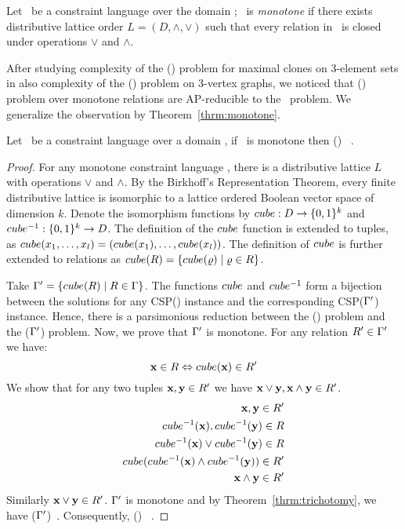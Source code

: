 \begin{defi} 
Let \mrelset\ be a constraint language over the domain \mD; \mrelset\ is \emph{monotone}
if there exists distributive lattice order \(L=(D,\wedge,\vee)\) such that every relation 
in \mrelset\ is closed under operations \(\vee\) and \(\wedge\)\@.
\end{defi}

After studying complexity of the \ccsp(\mrelset) problem for maximal clones on 3-element sets
in \cite{mvl} also complexity of the \chom(\mH) problem on 3-vertex graphs,
we noticed that \ccsp(\mrelset) problem over 
monotone relations are AP-reducible to the \cdsp\ problem. We generalize the observation by
Theorem~\ref{thrm:monotone}\@.

\begin{theorem} \label{thrm:monotone}
Let \mrelset\ be a constraint language over a domain \mD, if 
\mrelset\ is monotone then \ccsp(\mrelset) \maple\ \cbis\@.
\end{theorem}

\begin{proof}
For any monotone constraint language \mrelset, there is a distributive lattice \(L\) with operations
\(\vee\) and \(\wedge\)\@. By the Birkhoff's Representation Theorem, every finite distributive lattice
is isomorphic to a lattice ordered Boolean vector space of dimension \(k\)\@.
Denote the isomorphism functions by \(cube: D \to \{{0,1}\}^k\) and 
\(cube^{-1} : \{{0,1}\}^k\to D\)\@. The definition of the \(cube\) function
is extended to tuples, as \(cube(x_1,\dotsc,x_l)=(cube(x_1),\dotsc,cube(x_l))\)\@.
The definition of \(cube\) is further extended to relations as 
\(cube(R) = \{{cube(\varrho) \mid \varrho \in R}\}\)\@.

Take \(\Gamma'=\{{cube(R)\mid R\in \Gamma}\}\)\@. The functions \(cube\) and
\(cube^{-1}\) form a bijection between the solutions for any CSP(\mrelset) instance and the 
corresponding CSP(\(\Gamma'\)) instance. Hence, there is a parsimonious reduction between 
the \ccsp(\mrelset) problem and the \ccsp(\(\Gamma'\)) problem. Now, we prove that
\(\Gamma'\) is monotone. For any relation \(R' \in \Gamma'\) we have:
\[\textbf{x} \in R \Leftrightarrow cube(\textbf{x}) \in R'\]
We show that for any two tuples \(\textbf{x},\textbf{y}\in R'\) we have 
\(\textbf{x} \vee \textbf{y}, \textbf{x}\wedge\textbf{y}\in R'\).
\begin{eqnarray*}
\textbf{x},\textbf{y} \in R'  \\
cube^{-1}(\textbf{x}),cube^{-1}(\textbf{y})\in R  \\
cube^{-1}(\textbf{x}) \vee cube^{-1}(\textbf{y}) \in R  \\
cube(cube^{-1}(\textbf{x})\wedge cube^{-1}(\textbf{y}))\in R' \\
\textbf{x} \wedge \textbf{y} \in R' \\
\end{eqnarray*}
Similarly \(\textbf{x} \vee \textbf{y} \in R'\)\@.
\(\Gamma'\) is monotone and by Theorem~\ref{thrm:trichotomy}, we have 
\ccsp(\(\Gamma'\))\maple\ \cbis\@. Consequently, \ccsp(\mrelset) \maple\ \cbis\@.
\end{proof}

